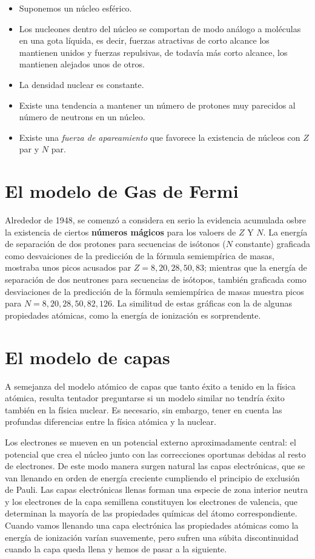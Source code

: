 \begin{itemize}
    \item Suponemos un núcleo esférico.
    \item Los nucleones dentro del núcleo se comportan de modo análogo a moléculas en una gota líquida, es decir, fuerzas atractivas de corto alcance los mantienen unidos y fuerzas repulsivas, de todavía más corto alcance, los mantienen alejados unos de otros.
    \item La densidad nuclear es constante. 
    \item Existe una tendencia a mantener un número de protones muy parecidos al número de neutrons en un núcleo.
    \item Existe una \textit{fuerza de apareamiento} que favorece la existencia de núcleos con $Z$ par y $N$ par.
\end{itemize}

\section{El modelo de Gas de Fermi}

Alrededor de 1948, se comenzó a considera en serio la evidencia acumulada osbre la existencia de ciertos \textbf{números mágicos} para los valoers de $Z$ Y $N$. La energía de separación de dos protones para secuencias de isótonos ($N$ constante) graficada como desvaiciones de la predicción de la fórmula semiempírica de masas, mostraba unos picos acusados par $Z=8,20,28,50,83$; mientras que la energía de separación de dos neutrones para secuencias de isótopos, también graficada como desviaciones de la predicción de la fórmula semiempírica de masas muestra picos para $N=8,20,28,50,82,126$. La similitud de estas gráficas con la de algunas propiedades atómicas, como la energía de ionización es sorprendente.

\section{El modelo de capas}

A semejanza del modelo atómico de capas que tanto éxito a tenido en la física atómica, resulta tentador preguntarse si un modelo similar no tendría éxito también en la física nuclear. Es necesario, sin embargo, tener en cuenta las profundas diferencias entre la física atómica y la nuclear. 

Los electrones se mueven en un potencial externo aproximadamente central: el potencial que crea el núcleo junto con las correcciones oportunas debidas al resto de electrones. De este modo manera surgen natural las capas electrónicas, que se van llenando en orden de energía creciente cumpliendo el principio de exclusión de Pauli. Las capas electrónicas llenas forman una especie de zona interior neutra y los electrones de la capa semillena constituyen los electrones de valencia, que determinan la mayoría de las propiedades químicas del átomo correspondiente. Cuando vamos llenando una capa electrónica las propiedades atómicas como la energía de ionización varían suavemente, pero sufren una súbita discontinuidad cuando la capa queda llena y hemos de pasar a la siguiente. 

